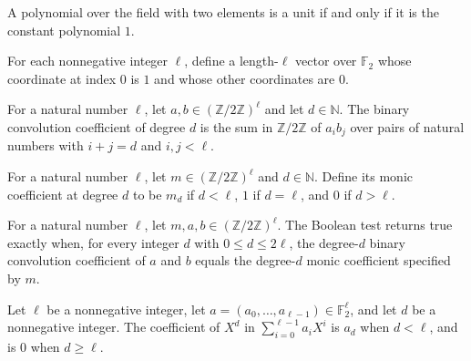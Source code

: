 \begin{theorem}
\leanok
{}
A polynomial over the field with two elements is a unit if and only if it is the
constant polynomial $1$.
\end{theorem}

\begin{definition}
\label{FABL.binaryOneCoefficients}
\leanok
{}
For each nonnegative integer $\ell$, define a length-$\ell$ vector over $\mathbb{F}_2$
whose coordinate at index $0$ is $1$ and whose other coordinates are $0$.
\end{definition}

\begin{definition}
\label{FABL.binaryConvolutionCoefficient}
\leanok
{}
For a natural number $\ell$, let $a,b\in(\mathbb{Z}/2\mathbb{Z})^\ell$ and let
$d\in\mathbb{N}$. The binary convolution coefficient of degree $d$ is the sum in
$\mathbb{Z}/2\mathbb{Z}$ of $a_i b_j$ over pairs of natural numbers with $i+j=d$ and
$i,j<\ell$.
\end{definition}

\begin{definition}
\label{FABL.binaryMonicCoefficient}
\leanok
{}
For a natural number $\ell$, let $m\in(\mathbb{Z}/2\mathbb{Z})^\ell$ and
$d\in\mathbb{N}$. Define its monic coefficient at degree $d$ to be $m_d$ if $d<\ell$,
$1$ if $d=\ell$, and $0$ if $d>\ell$.
\end{definition}

\begin{definition}
\label{FABL.binaryProductEqMonic}
\leanok
{}
For a natural number $\ell$, let $m,a,b\in(\mathbb{Z}/2\mathbb{Z})^\ell$. The Boolean
test returns true exactly when, for every integer $d$ with $0\le d\le 2\ell$, the
degree-$d$ binary convolution coefficient of $a$ and $b$ equals the degree-$d$ monic
coefficient specified by $m$.
\end{definition}

\begin{theorem}
\label{FABL.coeff_binaryLowPolynomial}
\leanok
{}
Let $\ell$ be a nonnegative integer, let $a=(a_0,\ldots,a_{\ell-1})\in\mathbb F_2^\ell$,
and let $d$ be a nonnegative integer. The coefficient of $X^d$ in
$\sum_{i=0}^{\ell-1}a_iX^i$ is $a_d$ when $d<\ell$, and is $0$ when $d\ge\ell$.
\end{theorem}

